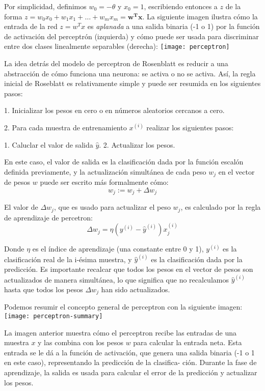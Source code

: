 Por simplicidad, definimos $w_0=-\theta$ y $x_0=1$, escribiendo entonces a $z$ de la
forma $z=w_0x_0 + w_1x_1 + \dots + w_mx_m = \mathbf{w^Tx}$.
La siguiente imagen ilustra cómo la entrada de la red $z=w^Tx$ es \textit{aplanada}
a una salida binaria (-1 o 1) por la función de activación del perceptrón (izquierda)
y cómo puede ser usada para discriminar entre dos clases linealmente separables (derecha):
\texttt{[image: perceptron]}\cite{python}

La idea detrás del modelo de perceptron de Rosenblatt es reducir a una abstracción de cómo funciona
una neurona: se activa o no se activa. Así, la regla inicial de Roseblatt es relativamente
simple y puede ser resumida en los siguientes pasos:

1. Inicializar los pesos en cero o en números aleatorios cercanos a cero.

2. Para cada muestra de entrenamiento $x^{(i)}$ realizar los siguientes pasos:

1. Caluclar el valor de salida $\hat y$.
2. Actualizar los pesos.


En este caso, el valor de salida es la clasificación dada por la función escalón
definida previamente, y la actualización simultánea de cada peso $w_j$ en el
vector de pesos $w$ puede ser escrito más formalmente cómo:
\begin{equation}
  w_j := w_j + \Delta w_j
\end{equation}

El valor de $\Delta w_j$, que es usado para actualizar el peso $w_j$, es
calculado por la regla de aprendizaje de percetron:
\begin{equation}
  \Delta w_j = \eta (y^{(i)} - \hat y^{(i)})x^{(i)}_j
\end{equation}

Donde $\eta$ es el índice de aprendizaje (una constante entre 0 y 1),
$y^{(i)}$ es la clasificación real de la i-ésima muestra, y $\hat y^{(i)}$
es la clasificación dada por la predicción. Es importante recalcar que
todos los pesos en el vector de pesos son actualizados de manera
simultánea, lo que significa que no recalculamos $\hat y^{(i)}$ hasta que
todos los pesos $\Delta w_j$ han sido actualizados.

Podemos resumir el concepto general de perceptron con la siguiente imagen:
\texttt{[image: perceptron-summary]}\cite{python}

La imagen anterior muestra cómo el perceptron recibe las entradas de una
muestra $x$ y las combina con los pesos $w$ para calcular la entrada neta.
Esta entrada se le dá a la función de activación, que genera una salida
binaria (-1 o 1 en este caso), representando la predicción de la clasifica-
ción. Durante la fase de aprendizaje, la salida es usada para calcular el
error de la predicción y actualizar los pesos.

